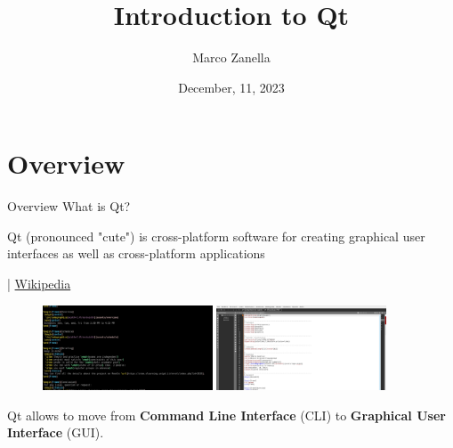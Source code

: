 \documentclass[11pt]{beamer}
\author{Marco Zanella}
\title{Introduction to Qt}
\institute{University of Padova}
\date{December, 11, 2023}
\renewcommand{\emph}[1]{\textbf{#1}}
\begin{document}
\begin{frame}
 \titlepage
\end{frame}

\begin{frame}
 \tableofcontents
\end{frame}


\section{Overview}
\begin{frame}{Overview}
 What is Qt?
 \begin{displayquote}
  Qt (pronounced "cute") is cross-platform software for creating graphical user interfaces as well as cross-platform applications
  \begin{flushright}
  | \href{https://en.wikipedia.org/wiki/Qt_(software)}{Wikipedia}
  \end{flushright}
 \end{displayquote}
 
 \begin{figure}
  \includegraphics[width=0.45\textwidth]{assets/figure-cli}
  \includegraphics[width=0.45\textwidth]{assets/figure-gui}
 \end{figure}
 Qt allows to move from \emph{Command Line Interface} (CLI) to \emph{Graphical User Interface} (GUI).
\end{frame}
\end{document}
